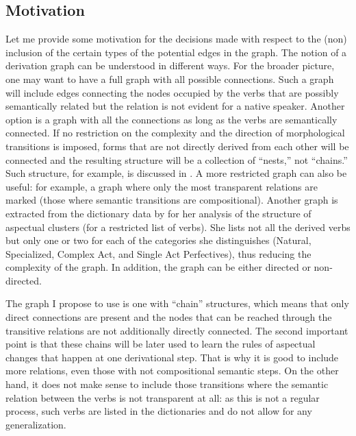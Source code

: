 \subsection{Motivation}\label{section:chains:motivation}
Let me provide some motivation for the decisions made with respect to the (non) inclusion of the certain types of the potential edges in the graph. The notion of a derivation graph can be understood in different ways. For the broader picture, one may want to have a full graph with all possible connections. Such a graph will include edges connecting the nodes occupied by the verbs that are possibly semantically related but the relation is not evident for a native speaker. Another option is a graph with all the connections as long as the verbs are semantically connected. If no restriction on the complexity and the direction of morphological transitions is imposed, forms that are not directly derived from each other will be connected and the resulting structure will be a collection of ``nests,'' not ``chains.'' Such structure, for example, is discussed in \citealt{Janda:10}. A more restricted graph can also be useful: for example, a graph where only the most transparent relations are marked (those where semantic transitions are compositional). Another graph is extracted from the dictionary data by \citet{Janda:07a} for her analysis of the structure of aspectual clusters (for a restricted list of verbs). She lists not all the derived verbs but only one or two for each of the categories she distinguishes (Natural, Specialized, Complex Act, and Single Act Perfectives), thus reducing the complexity of the graph. In addition, the graph can be either directed or non-directed. 
 
The graph I propose to use is one with ``chain'' structures, which means that only direct connections are present and the nodes that can be reached through the transitive relations are not additionally directly connected. The second important point is that these chains will be later used to learn the rules of aspectual changes that happen at one derivational step. That is why it is good to include more relations, even those with not compositional semantic steps. On the other hand, it does not make sense to include those transitions where the semantic relation between the verbs is not transparent at all: as this is not a regular process, such verbs are listed in the dictionaries and do not allow for any generalization. 

